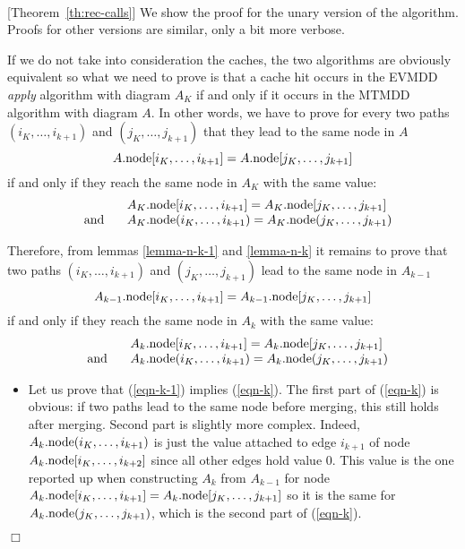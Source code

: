 \documentclass[nocover]             %
{NASA}                       %
\newcommand{\m}{\mbox}
\newcommand{\Proof}[1]{\par\noindent{\bf Proof.}~{#1}$\Box$}
\newcommand{\node}[1]{#1{\rm .node}}
\begin{document}
\Proof{[Theorem~\ref{th:rec-calls}]
  We show the proof for the unary version of the algorithm.
  Proofs for other versions are similar, only a bit more verbose.

If we do not take into consideration the caches, the two algorithms are obviously equivalent so 
what we need to prove is that a cache hit occurs in the EVMDD \emph{apply} 
algorithm with diagram $A_K$ if and only if it occurs in the MTMDD algorithm 
with diagram $A$. In other words, we have to prove for every two paths 
$(i_K, \ldots, i_{k+1})$ and $(j_K, \ldots, j_{k+1})$ that they lead to the 
same node in $A$
$$
\node{A}[i_K, \ldots, i_{k+1}] = \node{A}[j_K, \ldots, j_{k+1}]
$$
if and only if they reach the same node in $A_K$ with the same value:
$$
\begin{array}{ll}
&\node{A_K}[i_K, \ldots, i_{k+1}] = \node{A_K}[j_K, \ldots, j_{k+1}]\\
\;\;\;\m{and}\;\;\;&
\node{A_K}(i_K, \ldots, i_{k+1}) = \node{A_K}(j_K, \ldots, j_{k+1})
\end{array}
$$

Therefore, from lemmas \vref{lemma-n-k-1} and \vref{lemma-n-k} it remains to prove 
that two paths $(i_K, \ldots, i_{k+1})$ and $(j_K, \ldots, j_{k+1})$ lead to 
the same node in $A_{k-1}$
\begin{equation}
\label{eqn-k-1}
\node{A_{k-1}}[i_K, \ldots, i_{k+1}] = \node{A_{k-1}}[j_K, \ldots, j_{k+1}]
\end{equation}
if and only if they reach the same node in $A_k$ with the same value:
\begin{equation}
\label{eqn-k}
\begin{array}{ll}
&\node{A_k}[i_K, \ldots, i_{k+1}] = \node{A_k}[j_K, \ldots, j_{k+1}]\\
\;\;\;\m{and}\;\;\;&
\node{A_k}(i_K, \ldots, i_{k+1}) = \node{A_k}(j_K, \ldots, j_{k+1})
\end{array}
\end{equation}

\begin{itemize}

\item Let us prove that (\ref{eqn-k-1}) implies (\ref{eqn-k}).
The first part of (\ref{eqn-k}) is obvious: if two paths lead to the same node before
merging, this still holds after merging. Second part is slightly more complex.
Indeed, $\node{A_k}(i_K, \ldots, i_{k+1})$ is just the value attached to edge $i_{k+1}$ of node
$\node{A_k}[i_K, \ldots, i_{k+2}]$ since all other edges hold value $0$. This value
is the one reported up when constructing $A_k$ from $A_{k-1}$ for 
node $\node{A_k}[i_K, \ldots, i_{k+1}] = \node{A_k}[j_K, \ldots, j_{k+1}]$ so it is the
same for $\node{A_k}(j_K, \ldots, j_{k+1})$, which is the second part of (\ref{eqn-k}).


\end{itemize}}
\end{document}

